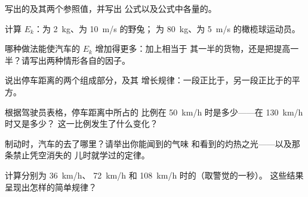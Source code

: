 \begin{exercise}[$\star$]\label{exo:g9:kinetic-energy-safety:1}
写出的及其两个参照值，并写出
公式以及公式中各量的。
\end{exercise}

\begin{exercise}[$\star$]\label{exo:g9:kinetic-energy-safety:2}
计算 $E_k$：为 \qty{2}{kg}、为 \qty{10}{m/s} 的野兔；
为 \qty{80}{kg}、为 \qty{5}{m/s} 的橄榄球运动员。
\end{exercise}

\begin{exercise}[$\star$]\label{exo:g9:kinetic-energy-safety:3}
哪种做法能使汽车的 $E_k$ 增加得更多：加上相当于
其一半的货物，还是把提高一半？请写出两种情形各自的因子。
\end{exercise}

\begin{exercise}[$\star$]\label{exo:g9:kinetic-energy-safety:4}
说出停车距离的两个组成部分，及其
增长规律：一段正比于，另一段正比于的平方。
\end{exercise}

\begin{exercise}[$\star$]\label{exo:g9:kinetic-energy-safety:5}
根据驾驶员表格，停车距离中所占的
比例在 \qty{50}{km/h} 时是多少——在 \qty{130}{km/h} 时又是多少？
这一比例发生了什么变化？
\end{exercise}

\begin{exercise}[$\star$]\label{exo:g9:kinetic-energy-safety:6}
制动时，汽车的去了哪里？请举出你能闻到的气味
和看到的灼热之光——以及那条禁止凭空消失的
儿时就学过的定律。
\end{exercise}

\begin{exercise}[$\star$]\label{exo:g9:kinetic-energy-safety:7}
计算分别为 \qty{36}{km/h}、
\qty{72}{km/h} 和 \qty{108}{km/h} 时的（取警觉的一秒）。
这些结果呈现出怎样的简单规律？
\end{exercise}

